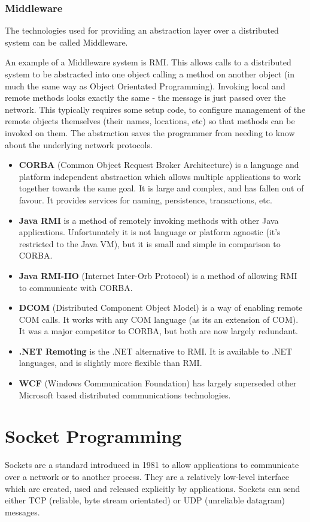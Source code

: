 \documentclass{article}
\begin{document}
\subsubsection{Middleware}
The technologies used for providing an abstraction layer over a distributed system can be called Middleware.

An example of a Middleware system is RMI. This allows calls to a distributed system to be abstracted into one object calling a method on another object (in much the same way as Object Orientated Programming). Invoking local and remote methods looks exactly the same - the message is just passed over the network. This typically requires some setup code, to configure management of the remote objects themselves (their names, locations, etc) so that methods can be invoked on them. The abstraction saves the programmer from needing to know about the underlying network protocols. 

\begin{itemize}
    \item \textbf{CORBA} (Common Object Request Broker Architecture) is a language and platform independent abstraction which allows multiple applications to work together towards the same goal. It is large and complex, and has fallen out of favour. It provides services for naming, persistence, transactions, etc.
    \item \textbf{Java RMI} is a method of remotely invoking methods with other Java applications. Unfortunately it is not language or platform agnostic (it's restricted to the Java VM), but it is small and simple in comparison to CORBA.
    \item \textbf{Java RMI-IIO} (Internet Inter-Orb Protocol) is a method of allowing RMI to communicate with CORBA.
    \item \textbf{DCOM} (Distributed Component Object Model) is a way of enabling remote COM calls. It works with any COM language (as its an extension of COM). It was a major competitor to CORBA, but both are now largely redundant.
    \item \textbf{.NET Remoting} is the .NET alternative to RMI. It is available to .NET languages, and is slightly more flexible than RMI.
    \item \textbf{WCF} (Windows Communication Foundation) has largely superseded other Microsoft based distributed communications technologies.
\end{itemize}

\section{Socket Programming}
Sockets are a standard introduced in 1981 to allow applications to communicate over a network or to another process. They are a relatively low-level interface which are created, used and released explicitly by applications. Sockets can send either TCP (reliable, byte stream orientated) or UDP (unreliable datagram) messages. 
\end{document}
